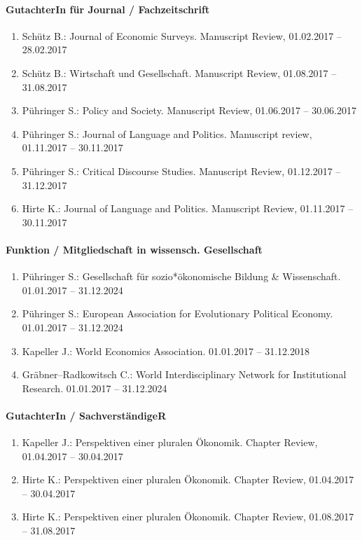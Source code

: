 \paragraph{GutachterIn für Journal / Fachzeitschrift}
\begin{enumerate}[leftmargin=*, labelsep=0.5cm]
\item Schütz B.: Journal of Economic Surveys. Manuscript Review, 01.02.2017 -- 28.02.2017
\item Schütz B.: Wirtschaft und Gesellschaft. Manuscript Review, 01.08.2017 -- 31.08.2017
\item Pühringer S.: Policy and Society. Manuscript Review, 01.06.2017 -- 30.06.2017
\item Pühringer S.: Journal of Language and Politics. Manuscript review, 01.11.2017 -- 30.11.2017
\item Pühringer S.: Critical Discourse Studies. Manuscript Review, 01.12.2017 -- 31.12.2017
\item Hirte K.: Journal of Language and Politics. Manuscript Review, 01.11.2017 -- 30.11.2017
\end{enumerate}
\paragraph{Funktion / Mitgliedschaft in wissensch. Gesellschaft}
\begin{enumerate}[leftmargin=*, labelsep=0.5cm]
\item Pühringer S.: Gesellschaft für sozio*ökonomische Bildung \& Wissenschaft. 01.01.2017 -- 31.12.2024
\item Pühringer S.: European Association for Evolutionary Political Economy. 01.01.2017 -- 31.12.2024
\item Kapeller J.: World Economics Association. 01.01.2017 -- 31.12.2018
\item Gräbner--Radkowitsch C.: World Interdisciplinary Network for Institutional Research. 01.01.2017 -- 31.12.2024
\end{enumerate}
\paragraph{GutachterIn / SachverständigeR}
\begin{enumerate}[leftmargin=*, labelsep=0.5cm]
\item Kapeller J.: Perspektiven einer pluralen Ökonomik. Chapter Review, 01.04.2017 -- 30.04.2017
\item Hirte K.: Perspektiven einer pluralen Ökonomik. Chapter Review, 01.04.2017 -- 30.04.2017
\item Hirte K.: Perspektiven einer pluralen Ökonomik. Chapter Review, 01.08.2017 -- 31.08.2017
\end{enumerate}
